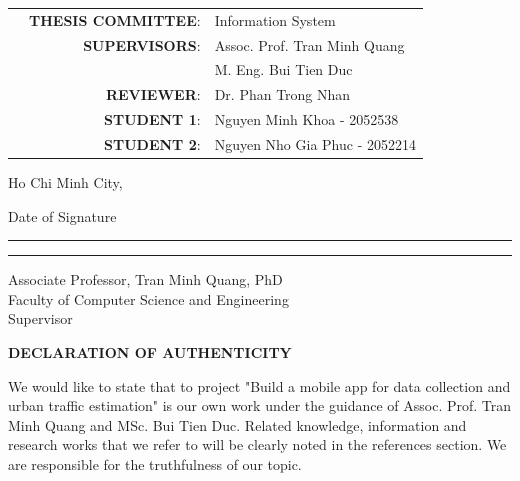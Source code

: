 \documentclass[13pt, a4paper]{article}
\begin{document}
\begin{titlepage}
\begin{center}
    \begin{table}[h]
        \normalsize
        \begin{tabular}{r r l}
        \hspace{2 cm} & \textbf{THESIS COMMITTEE}: & Information System \\
        & \textbf{SUPERVISORS}: & Assoc. Prof. Tran Minh Quang \\ 
        & & M. Eng. Bui Tien Duc\\
        & \textbf{REVIEWER}: & Dr. Phan Trong Nhan \\
        & \textbf{STUDENT 1}: & Nguyen Minh Khoa - 2052538\\
        & \textbf{STUDENT 2}: & Nguyen Nho Gia Phuc - 2052214 \\ 
        \end{tabular}
    \end{table}
    \vspace{2cm}
    
    Ho Chi Minh City, \DTMtoday
    
    \end{center}
\end{titlepage}


\bigskip  \hfill \parbox{1.35in}{\small Date of Signature}  
\vspace{2\baselineskip}  
\newline
\noindent\rule{4in}{0.7pt} \hfill \rule{1.5in}{0.7pt}  
\newline
\newline
\noindent \small Associate Professor, Tran Minh Quang, PhD\\ 
\small Faculty of Computer Science and Engineering\\ 
\small Supervisor

\newpage
\begin{center}
    \Large{\textbf{DECLARATION OF AUTHENTICITY}}
\end{center}
We would like to state that to project "Build a mobile app for data collection and urban traffic estimation" is our own work under the guidance of Assoc. Prof. Tran Minh Quang and MSc. Bui Tien Duc. Related knowledge, information and research works that we refer to will be clearly noted in the references section.
We are responsible for the truthfulness of our topic.
\end{document}
